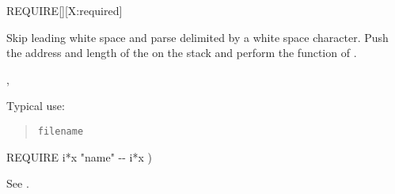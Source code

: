 \begin{worddef}{}{REQUIRE}[][X:required]
\item {}

	Skip leading white space and parse  delimited by a
	white space character. Push the address and length of the
	 on the stack and perform the function of
	.

\see {},

	\begin{rationale} %
		Typical use:
		\begin{quote}
			 \texttt{filename}
		\end{quote}
	\end{rationale}

	\begin{implement} %
		\word{:} REQUIRE  i*x "name" -{}- i*x ) \\
		\tab {}  \word{;}
	\end{implement}

	\begin{testing} %
		See .
	\end{testing}
\end{worddef}



